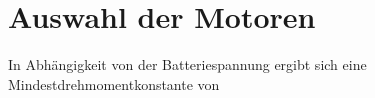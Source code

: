 \renewcommand{\autoren}{Stephan Morongowski}
\newpage
\section{Auswahl der Motoren}

In Abhängigkeit von der Batteriespannung ergibt sich eine Mindestdrehmomentkonstante von


\newpage

